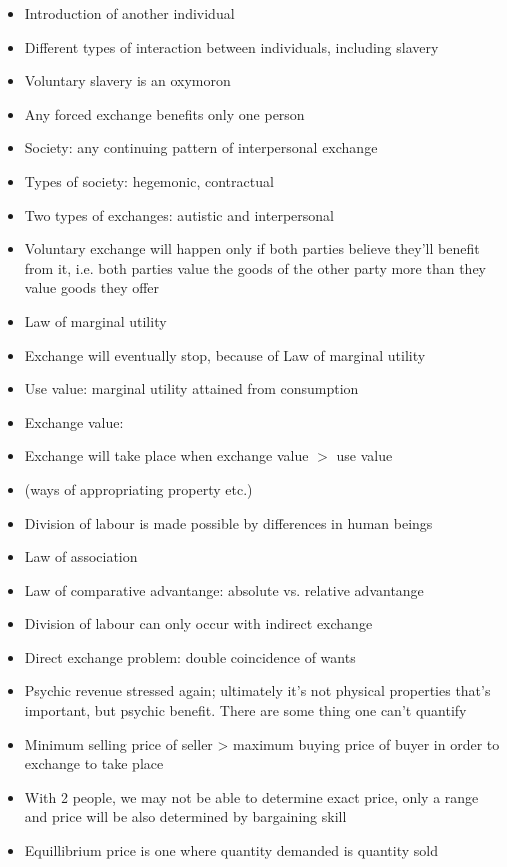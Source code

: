 \documentclass[]{article}
\begin{document}
\begin{itemize}
    \item Introduction of another individual
    \item Different types of interaction between individuals, including slavery
    \item Voluntary slavery is an oxymoron
    \item Any forced exchange benefits only one person
    \item Society: any continuing pattern of interpersonal exchange
    \item Types of society: hegemonic, contractual
    \item Two types of exchanges: autistic and interpersonal
    \item Voluntary exchange will happen only if both parties believe they'll benefit from it, i.e. both parties value the goods of the other party more than they value goods they offer
    \item Law of marginal utility
    \item Exchange will eventually stop, because of Law of marginal utility
    \item Use value: marginal utility attained from consumption
    \item Exchange value: 
    \item Exchange will take place when exchange value $>$ use value
    \item (ways of appropriating property etc.)
    \item Division of labour is made possible by differences in human beings
    \item Law of association
    \item Law of comparative advantange: absolute vs. relative advantange
    \item Division of labour can only occur with indirect exchange
    \item Direct exchange problem: double coincidence of wants
    \item Psychic revenue stressed again; ultimately it's not physical properties that's important, but psychic benefit. There are some thing one can't quantify
    \item Minimum selling price of seller > maximum buying price of buyer in order to exchange to take place
    \item With 2 people, we may not be able to determine exact price, only a range and price will be also determined by bargaining skill
    \item Equillibrium price is one where quantity demanded is quantity sold

\end{itemize}
\end{document}
